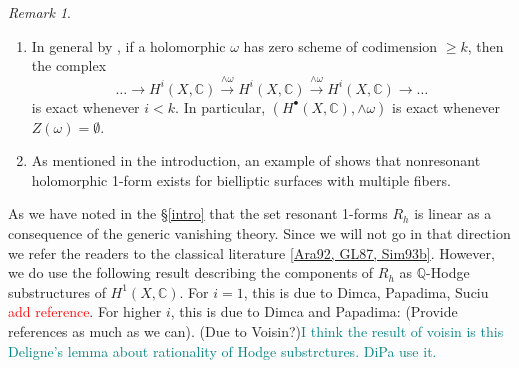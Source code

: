 \documentclass[a4paper,12pt,reqno]{amsart}
\theoremstyle{plain}
\theoremstyle{definition}
\theoremstyle{remark}
\newtheorem{remark}[theorem]{Remark}
\newcommand{\C}{\mathbb C}
\newcommand{\sH}{\mathcal{H}}
\newcommand{\sO}{\mathcal{O}}
\newcommand{\bbC}{\mathbb{C}}
\newcommand{\bbL}{\mathbb{L}}
\newcommand{\bbQ}{\mathbb{Q}}
\newcommand{\sorry}[1]{\textcolor{red}{#1}}
\begin{document}
\begin{remark}
\begin{enumerate}

\item In general by \cite[Proposition 3.4]{GL87}, if a holomorphic $\omega$ has zero scheme of codimension $\geq k$, then the complex $$\ldots\to H^{i}(X,\C)\overset{\wedge\omega}{\rightarrow}H^{i}(X,\C)\overset{\wedge\omega}{\rightarrow}H^{i}(X,\C)\to\ldots$$ is exact whenever $i<k.$ 
In particular, $(H^{\bullet}(X,\bbC), \wedge\omega)$ is exact whenever $Z(\omega) = \emptyset$. 

 
\item As mentioned in the introduction, an example of \cite{DJL17} shows that
nonresonant holomorphic 1-form exists for bielliptic surfaces with multiple fibers. 
\end{enumerate}
\end{remark}


As we have noted in the \S \ref{intro} that the set resonant 1-forms $R_h$ is linear as a consequence of the generic vanishing theory. Since we will not go in that
direction we refer the readers to the classical literature \ref{Ara92, GL87, Sim93b}. However, we do use the following result describing the components of
$R_h$ as $\bbQ$-Hodge substructures of $H^1(X, \bbC)$. For $i=1$, this is due to Dimca, Papadima, Suciu \sorry{add reference}. For higher $i$, this is due to Dimca and Papadima:
 {\color{red} (Provide references as much as we can)}. {\color{red} (Due to Voisin?)}\textcolor{teal}{I think the result of voisin is this Deligne's lemma about rationality of Hodge substrctures. DiPa use it.} 
\end{document}
